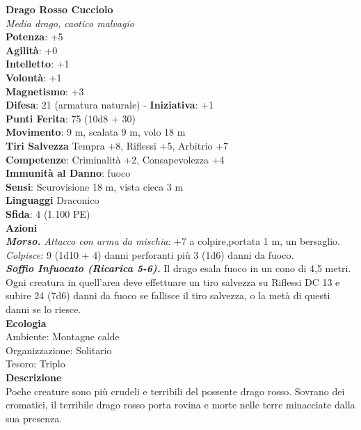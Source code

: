 \begin{multicols}{2}
\medskip\textbf{Drago Rosso Cucciolo}\\
\emph{Media drago, caotico malvagio}\\
\textbf{Potenza}: +5\\
\textbf{Agilità}: +0\\
\textbf{Intelletto}: +1\\
\textbf{Volontà}: +1\\
\textbf{Magnetismo}: +3\\
\textbf{Difesa}: 21 (armatura naturale) - \textbf{Iniziativa}: +1\\
\textbf{Punti Ferita}: 75 (10d8 + 30)\\
\textbf{Movimento}: 9 m, scalata 9 m, volo 18 m\\
\textbf{Tiri Salvezza} Tempra +8, Riflessi +5, Arbitrio +7\\
\textbf{Competenze}: Criminalità +2, Consapevolezza +4\\
\textbf{Immunità al Danno}: fuoco\\
\textbf{Sensi}: Scurovisione 18 m, vista cieca 3 m\\
\textbf{Linguaggi} Draconico\\
\textbf{Sfida}: 4 (1.100 PE)\smallskip\\
\smallskip\textbf{Azioni}\\
\emph{\textbf{Morso.} Attacco con arma da mischia}: +7 a colpire,portata 1 m, un bersaglio. \\
\emph{Colpisce:} 9 (1d10 + 4) danni perforanti più 3 (1d6) danni da fuoco.\\
\emph{\textbf{Soffio Infuocato (Ricarica 5-6).}} Il drago esala fuoco in un cono di 4,5 metri. Ogni creatura in quell'area deve effettuare un tiro salvezza su Riflessi DC 13 e subire 24 (7d6) danni da fuoco se fallisce il tiro salvezza, o la metà di questi danni se lo riesce.\\
\textbf{Ecologia}\\
Ambiente: Montagne calde\\
Organizzazione: Solitario\\
Tesoro: Triplo\\
\textbf{Descrizione}\\
Poche creature sono più crudeli e terribili del possente drago rosso. Sovrano dei cromatici, il terribile drago rosso porta rovina e morte nelle terre minacciate dalla sua presenza.\\


\end{multicols}
